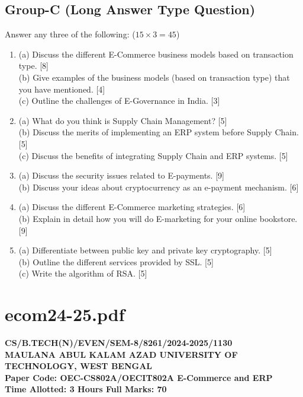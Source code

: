 \documentclass{article}
\begin{document}
\subsection*{Group-C (Long Answer Type Question)}
Answer any three of the following: ($15 \times 3 = 45$)
\begin{enumerate}
    \item[7.] 
    (a) Discuss the different E-Commerce business models based on transaction type. [8] \\
    (b) Give examples of the business models (based on transaction type) that you have mentioned. [4] \\
    (c) Outline the challenges of E-Governance in India. [3]
    \item[8.] 
    (a) What do you think is Supply Chain Management? [5] \\
    (b) Discuss the merits of implementing an ERP system before Supply Chain. [5] \\
    (c) Discuss the benefits of integrating Supply Chain and ERP systems. [5]
    \item[9.] 
    (a) Discuss the security issues related to E-payments. [9] \\
    (b) Discuss your ideas about cryptocurrency as an e-payment mechanism. [6]
    \item[10.] 
    (a) Discuss the different E-Commerce marketing strategies. [6] \\
    (b) Explain in detail how you will do E-marketing for your online bookstore. [9]
    \item[11.] 
    (a) Differentiate between public key and private key cryptography. [5] \\
    (b) Outline the different services provided by SSL. [5] \\
    (c) Write the algorithm of RSA. [5]
\end{enumerate}


\newpage
\section*{ecom24-25.pdf}
\textbf{CS/B.TECH(N)/EVEN/SEM-8/8261/2024-2025/1130} \\
\textbf{MAULANA ABUL KALAM AZAD UNIVERSITY OF TECHNOLOGY, WEST BENGAL} \\
\textbf{Paper Code: OEC-CS802A/OECIT802A \hfill E-Commerce and ERP} \\
\textbf{Time Allotted: 3 Hours \hfill Full Marks: 70}
\end{document}
